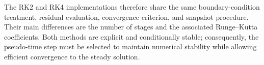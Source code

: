 The RK2 and RK4 implementations therefore share the same
boundary-condition treatment, residual evaluation, convergence
criterion, and snapshot procedure. Their main differences
are the number of stages and the associated Runge--Kutta
coefficients. Both methods are explicit and conditionally
stable; consequently, the pseudo-time step must be selected
to maintain numerical stability while allowing efficient
convergence to the steady solution.